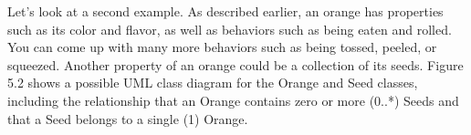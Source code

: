 
Let’s look at a second example. As described earlier, an orange has properties such as its color and flavor, as well as behaviors such as being eaten and rolled. You can come up with many more behaviors such as being tossed, peeled, or squeezed. Another property of an orange could be a collection of its seeds. Figure 5.2 shows a possible UML class diagram for the Orange and Seed classes, including the relationship that an Orange contains zero or more (0..*) Seeds and that a Seed belongs to a single (1) Orange.

























